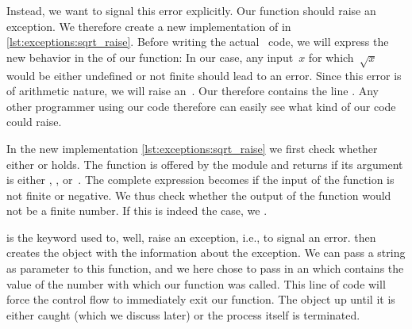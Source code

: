 Instead, we want to signal this error explicitly.
Our function should raise an exception.
We therefore create a new implementation of  in \cref{lst:exceptions:sqrt_raise}.
Before writing the actual \python\ code, we will express the new behavior in the  of our function:%
%
%
\fussy%
%
In our case, any input~$x$ for which~$\sqrt{x}$ would be either undefined or not finite should lead to an error.
Since this error is of arithmetic nature, we will raise an~.
Our  therefore contains the line .
Any other programmer using our code therefore can easily see what kind of  our code could raise.

In the new  implementation \cref{lst:exceptions:sqrt_raise} we first check whether either  or  holds.
The  function is offered by the  module and returns  if its argument is either , , or~.
The complete expression becomes  if the input of the function is not finite or negative.
We thus check whether the output of the  function would not be a finite number.
If this is indeed the case, we .

 is the keyword used to, well, raise an exception, i.e., to signal an error.
 then creates the object with the information about the exception.
We can pass a string as parameter to this function, and we here chose to pass in an  which contains the value of the number with which our  function was called.
This line of code will force the control flow to immediately exit our  function.
The  object  up until it is either caught (which we discuss later) or the process itself is terminated.

